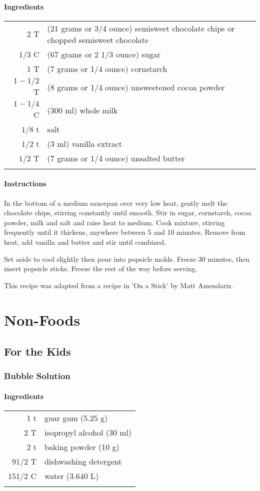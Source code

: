 \documentclass[12pt,landscape,twoside,twocolumn, openright, titlepage, draft]{book}
\begin{document}
\subsubsection{Ingredients}
\begin{tabular}{r p{1.5in}}
  2 T       & (21 grams or 3/4 ounce) semisweet chocolate chips or chopped semisweet chocolate \\
  $1/3$ C   & (67 grams or 2 1/3 ounce) sugar \\
  1 T       & (7 grams or 1/4 ounce) cornstarch \\
  $1-1/2$ T & (8 grams or 1/4 ounce) unsweetened cocoa powder \\
  $1-1/4$ C & (300 ml) whole milk \\
  $1/8$ t   & salt \\
  $1/2$ t   & (3 ml) vanilla extract \\
  $1/2$ T   & (7 grams or 1/4 ounce) unsalted butter \\ \\
\end{tabular}

\subsubsection{Instructions}
In the bottom of a medium saucepan over very low heat, gently melt the chocolate chips, stirring constantly until smooth. Stir in sugar, cornstarch, cocoa powder, milk and salt and raise heat to medium. Cook mixture, stirring frequently until it thickens, anywhere between 5 and 10 minutes. Remove from heat, add vanilla and butter and stir until combined.

Set aside to cool slightly then pour into popsicle molds. Freeze 30 minutes, then insert popsicle sticks. Freeze the rest of the way before serving.

This recipe was adapted from a recipe in 'On a Stick' by Matt Amendariz.

\chapter{Non-Foods}
\section{For the Kids}
\subsection{Bubble Solution}
\subsubsection{Ingredients}
\begin{tabular}{r p{1.5in}}
  1 t        & guar gum (5.25 g) \\
  2 T        & isopropyl alcohol (30 ml) \\
  2 t        & baking powder (10 g) \\
  $9 1/2$ T  & dishwashing detergent \\
  $15 1/2$ C & water (3.640 L) \\ \\
\end{tabular}
\end{document}

